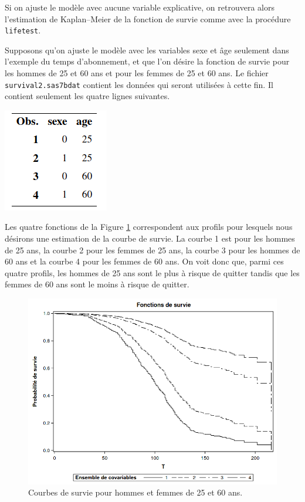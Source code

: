 \documentclass[
  11pt,
  letterpaper,
]{book}
\theoremstyle{definition}
\theoremstyle{definition}
\theoremstyle{definition}
\theoremstyle{definition}
\theoremstyle{remark}
\begin{document}
Si on ajuste le modèle avec aucune variable explicative, on retrouvera alors l'estimation de Kaplan--Meier de la fonction de survie comme avec la procédure \texttt{lifetest}.

Supposons qu'on ajuste le modèle avec les variables sexe et âge seulement dans l'exemple du temps d'abonnement, et que l'on désire la fonction de survie pour les hommes de 25 et 60 ans et pour les femmes de 25 et 60 ans. Le fichier \texttt{survival2.sas7bdat} contient les données qui seront utilisées à cette fin. Il contient seulement les quatre lignes suivantes.

\begin{center}\includegraphics[width=0.15\linewidth]{figures/05-survie-e19} \end{center}

Les quatre fonctions de la Figure \ref{fig:fig5-e20} correspondent aux profils pour lesquels nous désirons une estimation de la courbe de survie. La courbe 1 est pour les hommes de 25 ans, la courbe 2 pour les femmes de 25 ans, la courbe 3 pour les hommes de 60 ans et la courbe 4 pour les femmes de 60 ans. On voit donc que, parmi ces quatre profils, les hommes de 25 ans sont le plus à risque de quitter tandis que les femmes de 60 ans sont le moins à risque de quitter.

\begin{figure}

{\centering \includegraphics[width=0.8\linewidth]{figures/05-survie-e20} 

}

\caption{Courbes de survie pour hommes et femmes de 25 et 60 ans.}\label{fig:fig5-e20}
\end{figure}
\end{document}
